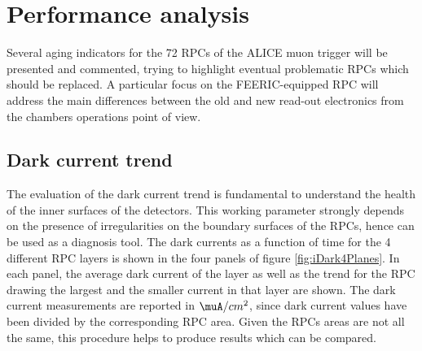
\section{Performance analysis}
Several aging indicators for the 72 RPCs of the ALICE muon trigger will be presented and commented, trying to highlight eventual problematic RPCs which should be replaced.
A particular focus on the FEERIC-equipped RPC will address the main differences between the old and new read-out electronics from the chambers operations point of view.

\subsection{Dark current trend}
The evaluation of the dark current trend is fundamental to understand the health of the inner surfaces of the detectors.
This working parameter strongly depends on the presence of irregularities on the boundary surfaces of the RPCs, hence can be used as a diagnosis tool.
The dark currents as a function of time for the 4 different RPC layers is shown in the four panels of figure \ref{fig:iDark4Planes}. 
In each panel, the average dark current of the layer as well as the trend for the RPC drawing the largest and the smaller current in that layer are shown.
The dark current measurements are reported in $\muA/cm^2$, since dark current values have been divided by the corresponding RPC area.
Given the RPCs areas are not all the same, this procedure helps to produce results which can be compared.

